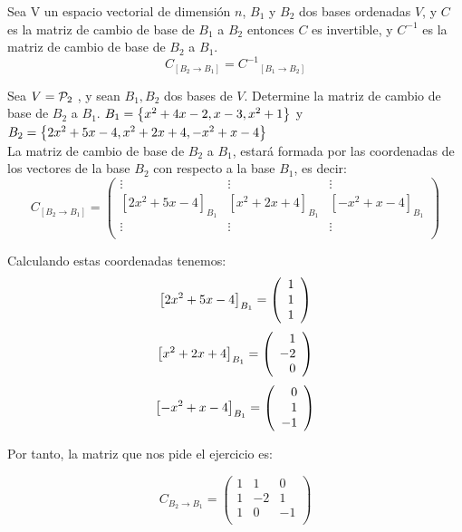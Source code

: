 \begin{theorem}[Corolario]
Sea V un espacio vectorial de dimensión $n$, $B_1$ y $B_2$  dos bases ordenadas $V$, y $C$ es la matriz de cambio de base de $B_1$ a $B_2$ entonces $C$ es invertible, y $C^{-1}$ es la matriz de cambio de base de $B_2$ a $B_1$.
\[
C_{[B_2\rightarrow B_1] }={C^{-1}}_{[B_1 \rightarrow B_2]}\]
\end{theorem}

\begin{ejemplo}
Sea $V=\mathcal{P}_2$ , y sean $B_1, B_2$ dos bases de $V$. Determine la matriz de cambio de base de $B_2$ a $B_1$. $ B_1= \left\{x^2+4x-2,x-3,x^2+1 \right\} $  y $B_2= \left\{2x^2+5x-4,x^2+2x+4,-x^2+x-4 \right\} $
~\\

La matriz de cambio de base de $B_2$ a $B_1$, estará formada por las coordenadas de los vectores de la base $B_2$ con respecto a la base $B_1$, es decir:
\[C_{[B_2 \rightarrow B_1]}= \left(\begin{array}{ccc}
\vdots & \vdots & \vdots \\
\left[2x^2+5x-4\right]_{B_1}&\left[x^2+2x+4\right]_{B_1}&  \left[-x^2+x-4\right]_{B_1}\\
\vdots & \vdots &  \vdots\\
\end{array}
\right)\]

Calculando estas coordenadas tenemos:
\[\left[2x^2+5x-4\right]_{B_1}=\left( \begin{array}{r} 1\\ 1\\ 1 \end{array} \right) \]
\[\left[x^2+2x+4\right]_{B_1}=\left( \begin{array}{r} 1\\ -2\\ 0 \end{array} \right) \]
\[\left[-x^2+x-4\right]_{B_1}=\left( \begin{array}{r} 0\\ 1\\ -1 \end{array} \right) \]

Por tanto, la matriz que nos pide el ejercicio es:

\[C_{B_2 \rightarrow B_1}= \left(\begin{array}{rrr}
1 & 1 & 0 \\
1&-2& 1\\
1 & 0 &  -1\\
\end{array}
\right)\]




\end{ejemplo}

